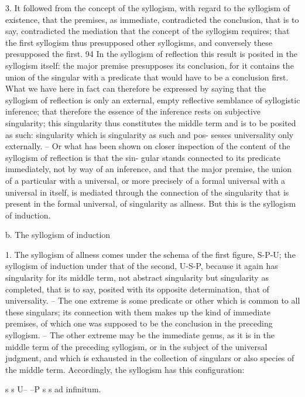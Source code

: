 3. It followed from the concept of the syllogism, with regard to the
syllogism of existence, that the premises, as immediate, contradicted the
conclusion, that is to say, contradicted the mediation that the concept
of the syllogism requires; that the first syllogism thus presupposed other
syllogisms, and conversely these presupposed the first. 94 In the syllogism
of reflection this result is posited in the syllogism itself: the major premise
presupposes its conclusion, for it contains the union of the singular with a
predicate that would have to be a conclusion first.
What we have here in fact can therefore be expressed by saying that
the syllogism of reflection is only an external, empty reflective semblance
of syllogistic inference; that therefore the essence of the inference rests on
subjective singularity; this singularity thus constitutes the middle term and
is to be posited as such: singularity which is singularity as such and pos-
sesses universality only externally. – Or what has been shown on closer
inspection of the content of the syllogism of reflection is that the sin-
gular stands connected to its predicate immediately, not by way of an
inference, and that the major premise, the union of a particular with a
universal, or more precisely of a formal universal with a universal in itself,
is mediated through the connection of the singularity that is present in
the formal universal, of singularity as allness. But this is the syllogism of
induction.

b. The syllogism of induction

1. The syllogism of allness comes under the schema of the first figure, S-P-U;
the syllogism of induction under that of the second, U-S-P, because it again
has singularity for its middle term, not abstract singularity but singularity
as completed, that is to say, posited with its opposite determination, that of
universality. – The one extreme is some predicate or other which is common
to all these singulars; its connection with them makes up the kind of
immediate premises, of which one was supposed to be the conclusion in
the preceding syllogism. – The other extreme may be the immediate genus,
as it is in the middle term of the preceding syllogism, or in the subject
of the universal judgment, and which is exhausted in the collection of
singulars or also species of the middle term. Accordingly, the syllogism has
this configuration:

s
s
U– –P
s
s
ad
infinitum.

